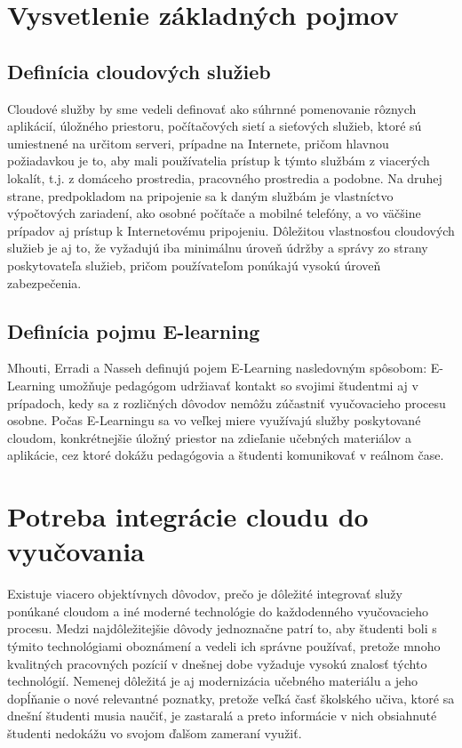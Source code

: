 \documentclass[10pt,slovak,a4paper]{article}%
\begin{document}
\section{Vysvetlenie základných pojmov}

\subsection{Definícia cloudových služieb}


Cloudové služby by sme vedeli definovať ako súhrnné pomenovanie rôznych aplikácií, úložného priestoru, počítačových sietí a sieťových služieb, ktoré sú umiestnené na určitom serveri, prípadne na Internete, pričom hlavnou požiadavkou je to, aby mali používatelia prístup k týmto službám z viacerých lokalít, t.j. z domáceho prostredia, pracovného prostredia a podobne\cite{Babu_enrichingeducation}\cite{Narkar_cloud-basededucation}. Na druhej strane, predpokladom na pripojenie sa k daným službám je vlastníctvo výpočtových zariadení, ako osobné počítače a mobilné telefóny, a vo väčšine prípadov aj prístup k Internetovému pripojeniu. Dôležitou vlastnosťou cloudových služieb je aj to, že vyžadujú iba minimálnu úroveň údržby a správy zo strany poskytovateľa služieb, pričom používateľom ponúkajú vysokú úroveň zabezpečenia\cite{Babu_enrichingeducation}.  

\subsection{Definícia pojmu E-learning}


Mhouti, Erradi a Nasseh definujú pojem E-Learning nasledovným spôsobom:  E-Learning umožňuje pedagógom udržiavať kontakt so svojimi študentmi aj v prípadoch, kedy sa z rozličných dôvodov nemôžu zúčastniť vyučovacieho procesu osobne. Počas E-Learningu sa vo veľkej miere využívajú služby poskytované cloudom, konkrétnejšie úložný priestor na zdieľanie učebných materiálov a aplikácie, cez ktoré dokážu pedagógovia a študenti komunikovať v reálnom čase.  

\section{Potreba integrácie cloudu do vyučovania}


Existuje viacero objektívnych dôvodov, prečo je dôležité integrovať služy ponúkané cloudom a iné moderné technológie do každodenného vyučovacieho procesu. Medzi najdôležitejšie dôvody jednoznačne patrí to, aby študenti boli s týmito technológiami oboznámení a vedeli ich správne používať, pretože mnoho kvalitných pracovných pozícií v dnešnej dobe vyžaduje vysokú znalosť týchto technológií\cite{Babu_enrichingeducation}. Nemenej dôležitá je aj modernizácia učebného materiálu a jeho dopĺňanie o nové relevantné poznatky, pretože veľká časť školského učiva, ktoré sa dnešní študenti musia naučiť, je zastaralá a preto informácie v nich obsiahnuté študenti nedokážu vo svojom ďalšom zameraní využiť. 
\end{document}
